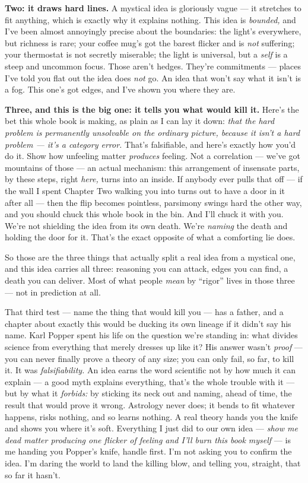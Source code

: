 \documentclass[11pt,openany]{book}
\begin{document}
\textbf{Two: it draws hard lines.} A mystical idea is gloriously vague — it stretches to fit anything, which is exactly why it explains nothing. This idea is \textit{bounded,} and I’ve been almost annoyingly precise about the boundaries: the light’s everywhere, but richness is rare; your coffee mug’s got the barest flicker and is \textit{not} suffering; your thermostat is not secretly miserable; the light is universal, but a \textit{self} is a steep and uncommon focus. Those aren’t hedges. They’re commitments — places I’ve told you flat out the idea does \textit{not} go. An idea that won’t say what it isn’t is a fog. This one’s got edges, and I’ve shown you where they are.

\textbf{Three, and this is the big one: it tells you what would kill it.} Here’s the bet this whole book is making, as plain as I can lay it down: \textit{that the hard problem is permanently unsolvable on the ordinary picture, because it isn’t a hard problem — it’s a category error.} That’s falsifiable, and here’s exactly how you’d do it. Show how unfeeling matter \textit{produces} feeling. Not a correlation — we’ve got mountains of those — an actual mechanism: this arrangement of insensate parts, by these steps, right \textit{here,} turns into an inside. If anybody ever pulls that off — if the wall I spent Chapter Two walking you into turns out to have a door in it after all — then the flip becomes pointless, parsimony swings hard the other way, and you should chuck this whole book in the bin. And I’ll chuck it with you. We’re not shielding the idea from its own death. We’re \textit{naming} the death and holding the door for it. That’s the exact opposite of what a comforting lie does.

So those are the three things that actually split a real idea from a mystical one, and this idea carries all three: reasoning you can attack, edges you can find, a death you can deliver. Most of what people \textit{mean} by “rigor” lives in those three — not in prediction at all.

That third test — name the thing that would kill you — has a father, and a chapter about exactly this would be ducking its own lineage if it didn’t say his name. Karl Popper spent his life on the question we’re standing in: what divides science from everything that merely dresses up like it? His answer wasn’t \textit{proof} — you can never finally prove a theory of any size; you can only fail, so far, to kill it. It was \textit{falsifiability.} An idea earns the word scientific not by how much it can explain — a good myth explains everything, that’s the whole trouble with it — but by what it \textit{forbids:} by sticking its neck out and naming, ahead of time, the result that would prove it wrong. Astrology never does; it bends to fit whatever happens, risks nothing, and so learns nothing. A real theory hands you the knife and shows you where it’s soft. Everything I just did to our own idea — \textit{show me dead matter producing one flicker of feeling and I’ll burn this book myself} — is me handing you Popper’s knife, handle first. I’m not asking you to confirm the idea. I’m daring the world to land the killing blow, and telling you, straight, that so far it hasn’t.
\end{document}
